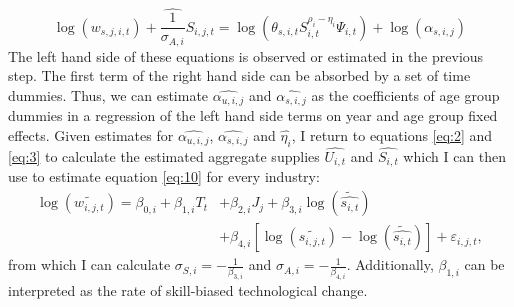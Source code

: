 \documentclass[]{article}
\begin{document}
\begin{equation}
  \label{eq:13}
  \log (w_{s,j,i,t}) + \widehat{\frac{1}{\sigma_{A,i}}}S_{i,j,t} = \log
  \left( \theta_{s,i,t}S_{i,t}^{\rho_{i}-\eta_{i}}\Psi_{i,t} \right) + \log(\alpha_{s,i,j})
\end{equation}
The left hand side of these equations is observed or estimated in the
previous step. The first term of the right hand side can be absorbed
by a set of time dummies. Thus, we can estimate
$\widehat{\alpha_{u,i,j}}$ and $\widehat{\alpha_{s,i,j}}$ as the
coefficients of age group dummies in a regression of the left hand
side terms on year and age group fixed effects. Given estimates for
$\widehat{\alpha_{u,i,j}}$, $\widehat{\alpha_{s,i,j}}$ and
$\widehat{\eta_{i}}$, I return to equations \eqref{eq:2} and
\eqref{eq:3} to calculate the estimated aggregate supplies
$\widehat{U_{i,t}}$ and $\widehat{S_{i,t}}$ which I can then use to
estimate equation \eqref{eq:10} for every industry:
\begin{align}
  \label{eq:1}
  \log(\widetilde{w_{i,j,t}}) = \beta_{0,i} + \beta_{1,i}T_{t} &+ \beta_{2,i}J_{j} +
                                                                 \beta_{3,i}\log\left( \widetilde{\widehat{s_{i,t}}}\right)
                                                                 \nonumber \\ &+
                                                                                \beta_{4,i}\left[ \log\left(\widetilde{s_{i,j,t}}\right)-\log\left(\widetilde{\widehat{s_{i,t}}}\right)\right]
                                                                                + \varepsilon_{i,j,t},
\end{align}
from which I can calculate $\sigma_{S,i}=-\frac{1}{\beta_{3,i}}$ and
$\sigma_{A,i}=-\frac{1}{\beta_{4,i}}$. Additionally, $\beta_{1,i}$ can
be interpreted as the rate of skill-biased technological change.
\end{document}
